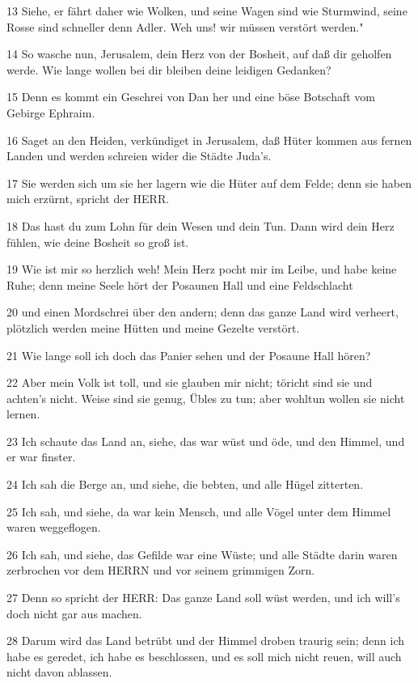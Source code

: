 \par 13 Siehe, er fährt daher wie Wolken, und seine Wagen sind wie Sturmwind, seine Rosse sind schneller denn Adler. Weh uns! wir müssen verstört werden."
\par 14 So wasche nun, Jerusalem, dein Herz von der Bosheit, auf daß dir geholfen werde. Wie lange wollen bei dir bleiben deine leidigen Gedanken?
\par 15 Denn es kommt ein Geschrei von Dan her und eine böse Botschaft vom Gebirge Ephraim.
\par 16 Saget an den Heiden, verkündiget in Jerusalem, daß Hüter kommen aus fernen Landen und werden schreien wider die Städte Juda's.
\par 17 Sie werden sich um sie her lagern wie die Hüter auf dem Felde; denn sie haben mich erzürnt, spricht der HERR.
\par 18 Das hast du zum Lohn für dein Wesen und dein Tun. Dann wird dein Herz fühlen, wie deine Bosheit so groß ist.
\par 19 Wie ist mir so herzlich weh! Mein Herz pocht mir im Leibe, und habe keine Ruhe; denn meine Seele hört der Posaunen Hall und eine Feldschlacht
\par 20 und einen Mordschrei über den andern; denn das ganze Land wird verheert, plötzlich werden meine Hütten und meine Gezelte verstört.
\par 21 Wie lange soll ich doch das Panier sehen und der Posaune Hall hören?
\par 22 Aber mein Volk ist toll, und sie glauben mir nicht; töricht sind sie und achten's nicht. Weise sind sie genug, Übles zu tun; aber wohltun wollen sie nicht lernen.
\par 23 Ich schaute das Land an, siehe, das war wüst und öde, und den Himmel, und er war finster.
\par 24 Ich sah die Berge an, und siehe, die bebten, und alle Hügel zitterten.
\par 25 Ich sah, und siehe, da war kein Mensch, und alle Vögel unter dem Himmel waren weggeflogen.
\par 26 Ich sah, und siehe, das Gefilde war eine Wüste; und alle Städte darin waren zerbrochen vor dem HERRN und vor seinem grimmigen Zorn.
\par 27 Denn so spricht der HERR: Das ganze Land soll wüst werden, und ich will's doch nicht gar aus machen.
\par 28 Darum wird das Land betrübt und der Himmel droben traurig sein; denn ich habe es geredet, ich habe es beschlossen, und es soll mich nicht reuen, will auch nicht davon ablassen.
